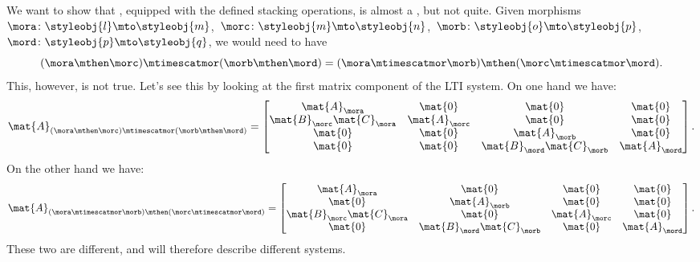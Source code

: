 \begin{example}
    We want to show that \LTI, equipped with the defined stacking operations, is almost a , but not quite.
    Given morphisms~$\mora\colon \styleobj{l}\mto \styleobj{m}$,~$\morc\colon \styleobj{m}\mto \styleobj{n}$,~$\morb\colon \styleobj{o}\mto \styleobj{p}$,~$\mord\colon \styleobj{p}\mto \styleobj{q}$, we would need to have
    \begin{equation*}
        (\mora \mthen \morc)
        \mtimescatmor (\morb\mthen \mord)=(\mora\mtimescatmor \morb)\mthen (\morc\mtimescatmor \mord).
    \end{equation*}
    This, however, is not true.
    Let's see this by looking at the first matrix component of the LTI system.
    On one hand we have:
    \begin{equation}
        \mat{A}_{(\mora \mthen \morc)\mtimescatmor (\morb\mthen \mord)}=
        \begin{bmatrix}
            \mat{A}_\mora              & \mat{0}       & \mat{0}                    & \mat{0}       \\
            \mat{B}_\morc\mat{C}_\mora & \mat{A}_\morc & \mat{0}                    & \mat{0}       \\
            \mat{0}                    & \mat{0}       & \mat{A}_\morb              & \mat{0}       \\
            \mat{0}                    & \mat{0}       & \mat{B}_\mord\mat{C}_\morb & \mat{A}_\mord
        \end{bmatrix}.
    \end{equation}
    On the other hand we have:
    \begin{equation}
        \mat{A}_{(\mora\mtimescatmor \morb)\mthen (\morc\mtimescatmor \mord)}=
        \begin{bmatrix}
            \mat{A}_\mora               & \mat{0}                     & \mat{0}       & \mat{0}       \\
            \mat{0}                     & \mat{A}_\morb               & \mat{0}       & \mat{0}       \\
            \mat{B}_\morc \mat{C}_\mora & \mat{0}                     & \mat{A}_\morc & \mat{0}       \\
            \mat{0}                     & \mat{B}_\mord \mat{C}_\morb & \mat{0}       & \mat{A}_\mord
        \end{bmatrix}.
    \end{equation}
    These two are different, and will therefore describe different systems.

\end{example}
